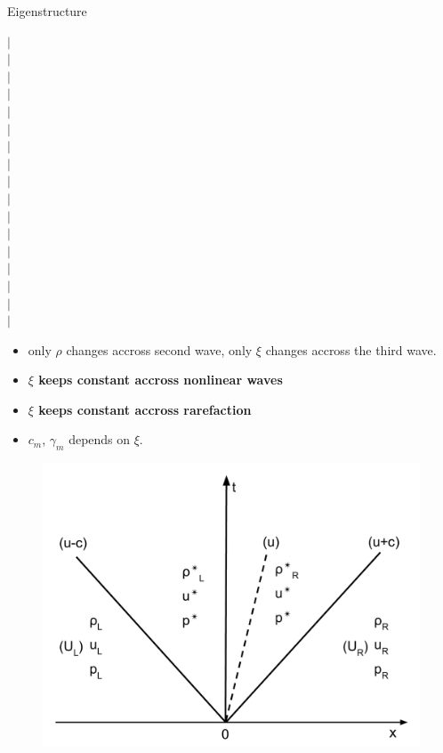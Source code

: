 \documentclass{beamer}
\begin{document}
\begin{frame}{Eigenstructure}
\begin{minipage}{.54\textwidth}
\end{minipage}
\begin{minipage}{.01\textwidth}
$\vert$\\
$\vert$\\
$\vert$\\
$\vert$\\
$\vert$\\
$\vert$\\
$\vert$\\
$\vert$\\
$\vert$\\
$\vert$\\
$\vert$\\
$\vert$\\
$\vert$\\
$\vert$\\
$\vert$\\
$\vert$\\
$\vert$\\
\end{minipage}
\begin{minipage}{.43\textwidth}
\begin{itemize}
\item only $\rho$ changes accross second wave, only $\xi$ changes accross the third wave.
\item \textbf{$\xi$ keeps constant accross nonlinear waves}
\item \textbf{$\xi$ keeps constant accross rarefaction}
\item $c_m$, $\gamma_m$ depends on $\xi$.
\end{itemize} 
\begin{figure}
\centering
\includegraphics[width=.80\textwidth]{./Chapter-2/Figures/Solution_Structure_RP_simplified}
\label{fig:Domain_3D}
\end{figure}
\end{minipage}
%
\end{frame}
\end{document}
